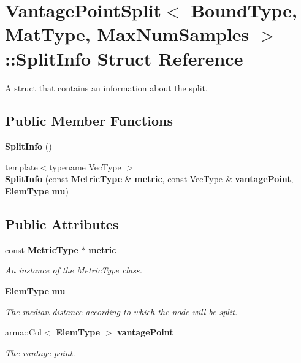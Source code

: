 \section{Vantage\+Point\+Split$<$ Bound\+Type, Mat\+Type, Max\+Num\+Samples $>$\+:\+:Split\+Info Struct Reference}
\label{structmlpack_1_1tree_1_1VantagePointSplit_1_1SplitInfo}


A struct that contains an information about the split.  


\subsection*{Public Member Functions}
\begin{DoxyCompactItemize}
\item 
\textbf{ Split\+Info} ()
\item 
{\footnotesize template$<$typename Vec\+Type $>$ }\\\textbf{ Split\+Info} (const \textbf{ Metric\+Type} \&\textbf{ metric}, const Vec\+Type \&\textbf{ vantage\+Point}, \textbf{ Elem\+Type} \textbf{ mu})
\end{DoxyCompactItemize}
\subsection*{Public Attributes}
\begin{DoxyCompactItemize}
\item 
const \textbf{ Metric\+Type} $\ast$ \textbf{ metric}
\begin{DoxyCompactList}\small\item\em An instance of the Metric\+Type class. \end{DoxyCompactList}\item 
\textbf{ Elem\+Type} \textbf{ mu}
\begin{DoxyCompactList}\small\item\em The median distance according to which the node will be split. \end{DoxyCompactList}\item 
arma\+::\+Col$<$ \textbf{ Elem\+Type} $>$ \textbf{ vantage\+Point}
\begin{DoxyCompactList}\small\item\em The vantage point. \end{DoxyCompactList}\end{DoxyCompactItemize}



